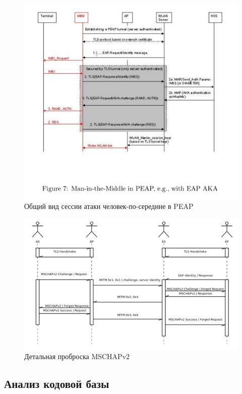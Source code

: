 \documentclass[oneside, final, 14pt]{extarticle}
\begin{document}
\begin{figure}
  \centering \includegraphics{res/peap-mitm-general.png}
  \caption{Общий вид сессии атаки человек-по-середине в PEAP}
\end{figure}

\begin{figure}
  \centering \includegraphics[scale=0.5]{res/clarified-mschapv2-mitm-in-peap.png}
  \caption{Детальная проброска MSCHAPv2}
\end{figure}

\subsection{Анализ кодовой базы}
\end{document}
